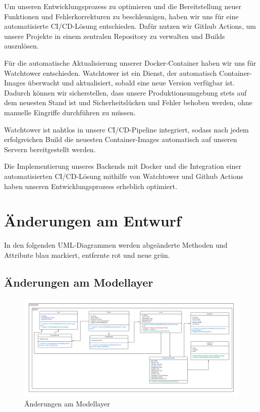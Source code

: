 \documentclass{implementierungsheft}
\begin{document}
Um unseren Entwicklungsprozess zu optimieren und die Bereitstellung neuer Funktionen und Fehlerkorrekturen zu beschleunigen, haben wir uns für eine automatisierte CI/CD-Lösung entschieden. Dafür nutzen wir Github Actions, um unsere Projekte in einem zentralen Repository zu verwalten und Builds auszulösen.

Für die automatische Aktualisierung unserer Docker-Container haben wir uns für Watchtower entschieden. Watchtower ist ein Dienst, der automatisch Container-Images überwacht und aktualisiert, sobald eine neue Version verfügbar ist. Dadurch können wir sicherstellen, dass unsere Produktionsumgebung stets auf dem neuesten Stand ist und Sicherheitslücken und Fehler behoben werden, ohne manuelle Eingriffe durchführen zu müssen.

Watchtower ist nahtlos in unsere CI/CD-Pipeline integriert, sodass nach jedem erfolgreichen Build die neuesten Container-Images automatisch auf unseren Servern bereitgestellt werden.

Die Implementierung unseres Backends mit Docker und die Integration einer automatisierten CI/CD-Lösung mithilfe von Watchtower und Github Actions haben unseren Entwicklungsprozess erheblich optimiert.
\newpage
\section{Änderungen am Entwurf}
In den folgenden UML-Diagrammen werden abgeänderte Methoden und Attribute blau markiert, entfernte rot und neue grün.
\subsection{Änderungen am Modellayer}
\begin{figure}[htp]
    \centering
    \includegraphics[width=\textwidth]{images/uml/modelLayer.pdf}
    \caption{Änderungen am Modellayer}
    \label{fig:modellayer}
\end{figure}
\end{document}
